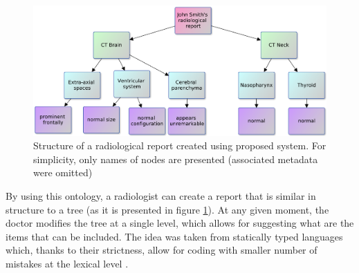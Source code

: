 \documentclass[12pt, twoside, openany]{report}
\theoremstyle{definition}
\begin{document}
\begin{figure}
    \centering
    \includegraphics[width=\linewidth]{report-tree.pdf}
    \caption{Structure of a radiological report created \label{fig:report-tree} using proposed system. For simplicity, only names of nodes are presented (associated metadata were omitted)}
\end{figure}

By using this ontology, a radiologist can create a report that is similar in structure to a tree (as it is presented in figure \ref{fig:report-tree}). At any given moment, the doctor modifies the tree at a single level, which allows for suggesting what are the items that can be included. The idea was taken from statically typed languages which, thanks to their strictness, allow for coding with smaller number of mistakes at the lexical level \cite{static-lang}.
\end{document}
